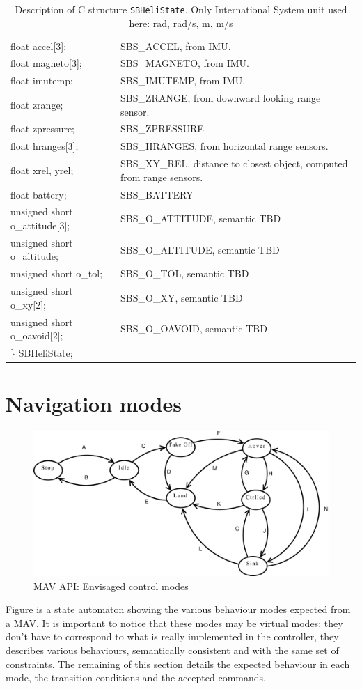 \documentclass{article}
\renewcommand{\ref}[1]{\link{\htmlref{#1}}{#1}}
\newcommand{\tab}{\hspace{5mm}}
\begin{document}
\begin{table}[htbp]
\begin{tabular}{|lp{}|}
\tab    float accel[3]; & SBS\_ACCEL, from IMU.\\
\tab    float magneto[3]; & SBS\_MAGNETO, from IMU.\\
\tab    float imutemp; & SBS\_IMUTEMP, from IMU.\\
\tab    float zrange; & SBS\_ZRANGE, from downward looking range sensor.\\ 
\tab    float zpressure; & SBS\_ZPRESSURE\\
\tab    float hranges[3]; & SBS\_HRANGES, from horizontal range sensors. \\
\tab    float xrel, yrel; & SBS\_XY\_REL, distance to closest object, computed
    from range sensors.\\
\tab    float battery; & SBS\_BATTERY\\
\tab    unsigned short o\_attitude[3]; & SBS\_O\_ATTITUDE, semantic TBD\\
\tab    unsigned short o\_altitude; & SBS\_O\_ALTITUDE, semantic TBD\\
\tab    unsigned short o\_tol; & SBS\_O\_TOL, semantic TBD\\
\tab    unsigned short o\_xy[2]; & SBS\_O\_XY, semantic TBD\\
\tab    unsigned short o\_oavoid[2]; & SBS\_O\_OAVOID, semantic TBD\\
\} SBHeliState; & \\
\hline
\end{tabular}
\caption{Description of C structure {\tt SBHeliState}. Only International System unit used here: rad, rad/s, m, m/s}
\label{table:SBHeliState}
\end{table}
        

\newpage
\appendix

\section{Navigation modes}
\label{sec:modes}
\begin{figure}[htb]
\centering
\includegraphics[width=0.9\columnwidth]{API_automaton}
\caption{MAV API: Envisaged control modes}
\label{fig:automaton}
\end{figure}
Figure \ref{fig:automaton} is a state automaton showing the various behaviour
modes expected from a MAV. It is important to notice that these modes may be
virtual modes: they don't have to correspond to what is really implemented in
the controller, they describes various behaviours, semantically consistent and
with the same set of constraints. The remaining of this section details the
expected behaviour in each mode, the transition conditions and the accepted
commands.
\end{document}
